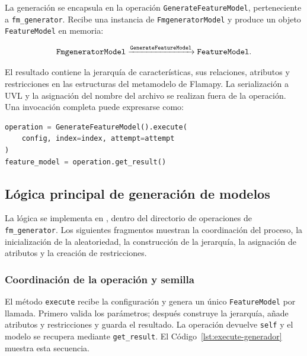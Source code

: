 La generación se encapsula en la operación
\texttt{GenerateFeatureModel}, perteneciente a \texttt{fm\_generator}.
Recibe una instancia de \texttt{FmgeneratorModel} y produce un objeto
\texttt{FeatureModel} en memoria:

\[
\text{\texttt{FmgeneratorModel}}
\xrightarrow{\text{\texttt{GenerateFeatureModel}}}
\text{\texttt{FeatureModel}}.
\]

El resultado contiene la jerarquía de características, sus relaciones,
atributos y restricciones en las estructuras del metamodelo de Flamapy. La
serialización a UVL y la asignación del nombre del archivo se realizan fuera
de la operación. Una invocación completa puede expresarse como:

\begin{lstlisting}[language=Python]
operation = GenerateFeatureModel().execute(
    config, index=index, attempt=attempt
)
feature_model = operation.get_result()
\end{lstlisting}

\subsection{Lógica principal de generación de modelos}
\label{subsec:calculos}

La lógica se implementa en , dentro del
directorio de operaciones de \texttt{fm\_generator}. Los siguientes
fragmentos muestran la coordinación del proceso, la inicialización de la
aleatoriedad, la construcción de la jerarquía, la asignación de atributos y
la creación de restricciones.

\subsubsection*{Coordinación de la operación y semilla}

El método \texttt{execute} recibe la configuración y genera un único
\texttt{FeatureModel} por llamada. Primero valida los parámetros; después
construye la jerarquía, añade atributos y restricciones y guarda el
resultado. La operación devuelve \texttt{self} y el modelo se recupera
mediante \texttt{get\_result}. El Código~\ref{lst:execute-generador}
muestra esta secuencia.

